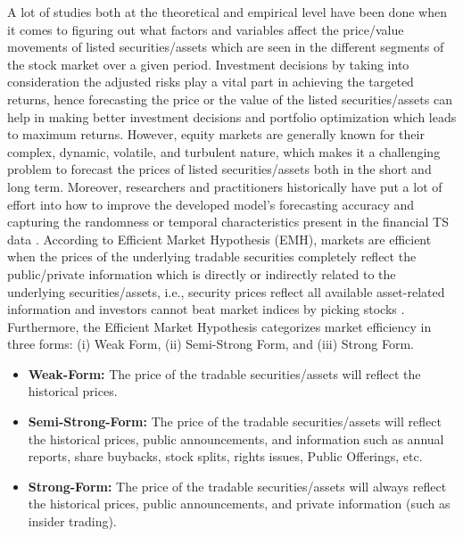 \documentclass[conference]{IEEEtran}
\begin{document}
A lot of studies both at the theoretical and empirical level have been done when it comes to figuring out what factors and variables affect the price/value movements of listed securities/assets which are seen in the different segments of the stock market over a given period. Investment decisions by taking into consideration the adjusted risks play a vital part in achieving the targeted returns, hence forecasting the price or the value of the listed securities/assets can help in making better investment decisions and portfolio optimization which leads to maximum returns. However, equity markets are generally known for their complex, dynamic, volatile, and turbulent nature, which makes it a challenging problem to forecast the prices of listed securities/assets both in the short and long term. Moreover, researchers and practitioners historically have put a lot of effort into how to improve the developed model's forecasting accuracy and capturing the randomness or temporal characteristics present in the financial TS data \cite{b16}.
According to Efficient Market Hypothesis (EMH), markets are efficient when the prices of the underlying tradable securities completely reflect the public/private information which is directly or indirectly related to the underlying securities/assets, i.e., security prices reflect all available asset-related information and investors cannot beat market indices by picking stocks \cite{b1}. Furthermore, the Efficient Market Hypothesis categorizes market efficiency in three forms: (i) Weak Form, (ii) Semi-Strong Form, and (iii) Strong Form.

\begin{itemize}
    \item \textbf{Weak-Form:} The price of the tradable securities/assets will reflect the historical prices.
    \item \textbf{Semi-Strong-Form:} The price of the tradable securities/assets will reflect the historical prices, public announcements, and information such as annual reports, share buybacks, stock splits, rights issues, Public Offerings, etc. 
    \item \textbf{Strong-Form:} The price of the tradable securities/assets will always reflect the historical prices, public announcements, and private information (such as insider trading).
\end{itemize}
\end{document}
